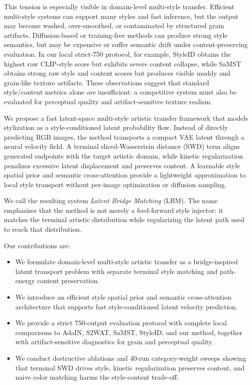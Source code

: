 ﻿\documentclass{article}
\begin{document}
This tension is especially visible in domain-level multi-style transfer. Efficient multi-style systems can support many styles and fast inference, but the output may become washed, over-smoothed, or contaminated by structured grain artifacts. Diffusion-based or training-free methods can produce strong style semantics, but may be expensive or suffer semantic drift under content-preserving evaluation. In our local strict-750 protocol, for example, StyleID obtains the highest raw CLIP-style score but exhibits severe content collapse, while SaMST obtains strong raw style and content scores but produces visible muddy and grain-like texture artifacts. These observations suggest that standard style/content metrics alone are insufficient: a competitive system must also be evaluated for perceptual quality and artifact-sensitive texture realism.

We propose a fast latent-space multi-style artistic transfer framework that models stylization as a style-conditioned latent probability flow. Instead of directly predicting RGB images, the method transports a compact VAE latent through a neural velocity field. A terminal sliced-Wasserstein distance (SWD) term aligns generated endpoints with the target artistic domain, while kinetic regularization penalizes excessive latent displacement and preserves content. A learnable style spatial prior and semantic cross-attention provide a lightweight approximation to local style transport without per-image optimization or diffusion sampling.

We call the resulting system \emph{Latent Bridge Matching} (LBM). The name emphasizes that the method is not merely a feed-forward style injector: it matches the terminal artistic distribution while regularizing the latent path used to reach that distribution.

Our contributions are:
\begin{itemize}
    \item We formulate domain-level multi-style artistic transfer as a bridge-inspired latent transport problem with separate terminal style matching and path-energy content preservation.
    \item We introduce an efficient style spatial prior and semantic cross-attention architecture that supports fast style-conditioned latent velocity prediction.
    \item We provide a strict 750-output evaluation protocol with complete local comparisons to AdaIN, S2WAT, SaMST, StyleID, and our method, together with artifact-sensitive diagnostics for grain and perceptual quality.
    \item We conduct destructive ablations and 40-run category-weight sweeps showing that terminal SWD drives style, kinetic regularization preserves content, and naive color matching harms the style-content trade-off.
\end{itemize}
\end{document}
